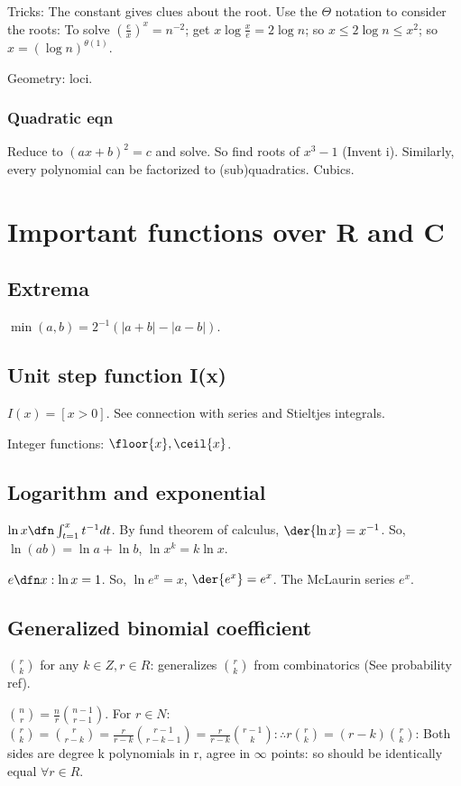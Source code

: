 \documentclass[oneside, article]{memoir}
\begin{document}
Tricks: The constant gives clues about the root. Use the $\Theta$ notation to consider the roots: To solve $(\frac{e}{x})^{x}=n^{-2}$; get $x \log \frac{x}{e} = 2 \log n$; so $x \leq 2 \log n \leq x^{2}$; so $x = (\log n)^{\theta(1)}$.

Geometry: loci.

\subsubsection{Quadratic eqn}
Reduce to $(ax+b)^{2}=c$ and solve. So find roots of $x^{3}-1$ (Invent i). Similarly, every polynomial can be factorized to (sub)quadratics. Cubics.

\section{Important functions over R and C}
\subsection{Extrema}
$\min(a, b) = 2^{-1}(|a+b| - |a-b|)$.

\subsection{Unit step function I(x)}
$I(x) = [x >0]$. See connection with series and Stieltjes integrals.

Integer functions: $\floor{x}, \ceil{x}$.

\subsection{Logarithm and exponential}
$\ln x \dfn \int_{t=1}^{x} t^{-1}dt$. By fund theorem of calculus, $\der{\ln x} = x^{-1}$. So, $\ln(ab) = \ln a + \ln b$, $\ln x^{k} = k \ln x$.

$e \dfn x: \ln x = 1$. So, $\ln e^{x} = x$, $\der{e^{x}} = e^{x}$. The McLaurin series $e^{x}$.

\subsection{Generalized binomial coefficient}
$\binom{r}{k}$ for any $k\in Z, r\in R$: generalizes $\binom{r}{k}$ from combinatorics (See probability ref).

$\binom{n}{r} = \frac{n}{r}\binom{n-1}{r-1}$. For $r \in N$: $\binom{r}{k} = \binom{r}{r-k} = \frac{r}{r-k}\binom{r-1}{r-k-1} = \frac{r}{r-k}\binom{r-1}{k}: \therefore r\binom{r}{k} = (r-k)\binom{r}{k}$: Both sides are degree k polynomials in r, agree in $\infty$ points: so should be identically equal $\forall r\in R$.
\end{document}
